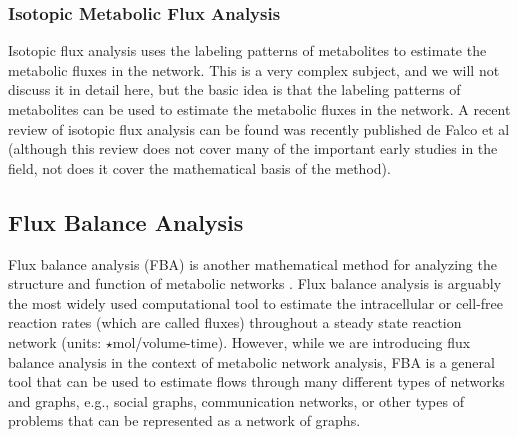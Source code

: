 \documentclass{article}[12pt]
\begin{document}
\subsubsection*{Isotopic Metabolic Flux Analysis}
Isotopic flux analysis uses the labeling patterns of metabolites to estimate the metabolic fluxes in the network.
This is a very complex subject, and we will not discuss it in detail here, but the basic idea is that the labeling patterns of metabolites can be used to estimate the metabolic fluxes in the network.
A recent review of isotopic flux analysis can be found was recently published de Falco et al \cite{D2RA03326G} (although this review does not cover many of the important early studies in the field, not does it cover the mathematical basis of the method).


\subsection{Flux Balance Analysis}
Flux balance analysis (FBA) is another mathematical method for analyzing the structure and function of metabolic networks \cite{Orth:2010aa}.
Flux balance analysis is arguably the most widely used computational tool to estimate the intracellular or cell-free reaction rates (which are called fluxes) 
throughout a steady state reaction network (units: $\star$mol/volume-time). 
However, while we are introducing flux balance analysis in the context of metabolic network analysis, FBA is a general tool that can be used to 
estimate flows through many different types of networks and graphs, e.g., social graphs, communication networks, or other types of problems that can be represented as a network of graphs.  
\end{document}
